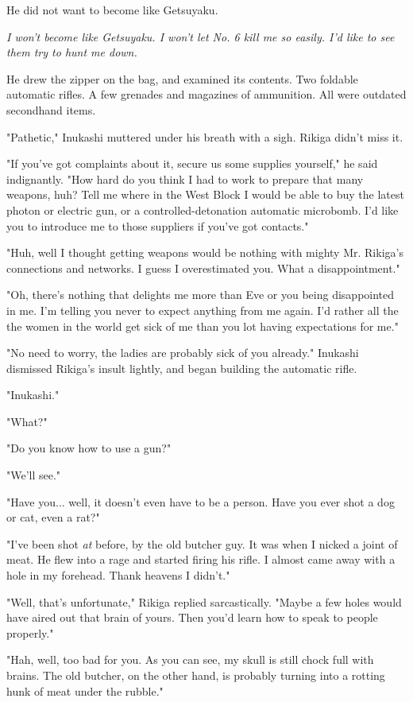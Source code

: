 He did not want to become like Getsuyaku.

\emph{I won't become like Getsuyaku. I won't let No. 6 kill me so easily. I'd
like to see them try to hunt me down.}

He drew the zipper on the bag, and examined its contents. Two foldable
automatic rifles. A few grenades and magazines of ammunition. All were
outdated secondhand items.

"Pathetic," Inukashi muttered under his breath with a sigh. Rikiga
didn't miss it.

"If you've got complaints about it, secure us some supplies yourself,"
he said indignantly. "How hard do you think I had to work to prepare
that many weapons, huh? Tell me where in the West Block I would be able
to buy the latest photon or electric gun, or a controlled-detonation
automatic microbomb. I'd like you to introduce me to those suppliers if
you've got contacts."

"Huh, well I thought getting weapons would be nothing with mighty Mr.
Rikiga's connections and networks. I guess I overestimated you. What a
disappointment."

"Oh, there's nothing that delights me more than Eve or you being
disappointed in me. I'm telling you never to expect anything from me
again. I'd rather all the the women in the world get sick of me than you
lot having expectations for me."

"No need to worry, the ladies are probably sick of you already."
Inukashi dismissed Rikiga's insult lightly, and began building the
automatic rifle.

"Inukashi."

"What?"

"Do you know how to use a gun?"

"We'll see."

"Have you... well, it doesn't even have to be a person. Have you ever
shot a dog or cat, even a rat?"

"I've been shot \emph{at} before, by the old butcher guy. It was when I nicked
a joint of meat. He flew into a rage and started firing his rifle. I
almost came away with a hole in my forehead. Thank heavens I didn't."

"Well, that's unfortunate," Rikiga replied sarcastically. "Maybe a few
holes would have aired out that brain of yours. Then you'd learn how to
speak to people properly."

"Hah, well, too bad for you. As you can see, my skull is still chock
full with brains. The old butcher, on the other hand, is probably
turning into a rotting hunk of meat under the rubble."

